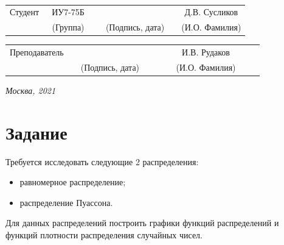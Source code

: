\documentclass[14pt, a4paper]{extarticle}
\begin{document}
	
	\noindent
	
	\noindent
	\\
	
	\vspace{1.5cm}
	\noindent
	\begin{tabular}{l c c c c c}
		Студент      & ~ИУ7-75Б~               & \hspace{2.5cm} & \hspace{2cm}                 & &  Д.В. 
		Сусликов \\\cline{2-2}\cline{4-4} \cline{6-6} 
		\hspace{3cm} & {\footnotesize(Группа)} &                & {\footnotesize(Подпись, дата)} & & {\footnotesize(И.О. Фамилия)}
	\end{tabular}
	
	\noindent
	\begin{tabular}{l c c c c}
		Преподаватель & \hspace{5cm}   & \hspace{2cm}                 & & ~~~~~~И.В. Рудаков~~~~~~\\\cline{3-3} \cline{5-5} 
		\hspace{3cm}  &                & {\footnotesize(Подпись, дата)} & & {\footnotesize(И.О. Фамилия)}
	\end{tabular}
	
	\vspace{0.6cm}
	\begin{center}	
		\vfill
		\large \textit {Москва, 2021}
	\end{center}
	
	\thispagestyle {empty}
	\pagebreak
	
	\clearpage
		
	\clearpage
	\section{Задание}
	Требуется исследовать следующие 2 распределения:
	\begin{itemize}
		\item[1)] равномерное распределение;
		\item[2)] распределение Пуассона.
	\end{itemize}
	Для данных распределений построить графики функций распределений и функций плотности распределения случайных чисел. 
	\newpage
	
\end{document}
